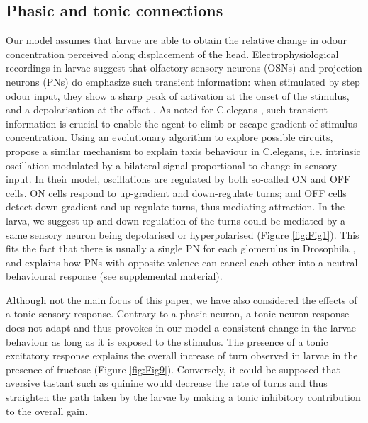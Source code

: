 \documentclass[10pt,a4paper]{article}
\begin{document}
\subsection{Phasic and tonic connections}
Our model assumes that larvae are able to obtain the relative change in odour concentration perceived along displacement of the head.  Electrophysiological recordings in larvae suggest that olfactory sensory neurons (OSNs) and projection neurons (PNs) do emphasize such transient information: when stimulated by step odour input, they show a sharp peak of activation at the onset of the stimulus, and a depolarisation at the offset \cite{schulze2015dynamical}. As noted for C.elegans \citep{lockery2011computational}, such transient information is crucial to enable the agent to climb or escape gradient of stimulus concentration. Using an evolutionary algorithm to explore possible circuits, \cite{izquierdo2010evolution} propose a similar mechanism to explain taxis behaviour in C.elegans, i.e. intrinsic oscillation modulated by a bilateral signal proportional to change in sensory input. In their model, oscillations are regulated by both so-called ON and OFF cells. ON cells respond to up-gradient and down-regulate turns; and OFF cells detect down-gradient and up regulate turns, thus mediating attraction. In the larva, we suggest up and down-regulation of the turns could be mediated by a same sensory neuron being depolarised or hyperpolarised (Figure \ref{fig:Fig1}). This fits the fact that there is usually a single PN for each glomerulus in Drosophila , and explains how PNs with opposite valence can cancel each other into a neutral behavioural response (see supplemental material). 

Although not the main focus of this paper, we have also considered the effects of a tonic sensory response. Contrary to a phasic neuron, a tonic neuron response does not adapt and thus provokes in our model a consistent change in the larvae behaviour as long as it is exposed to the stimulus. The presence of a tonic excitatory response explains the overall increase of turn observed in larvae in the presence of fructose (Figure \ref{fig:Fig9}). Conversely, it could be supposed that aversive tastant such as quinine would decrease the rate of turns and thus straighten the path taken by the larvae by making a tonic inhibitory contribution to the overall gain. 
\end{document}
